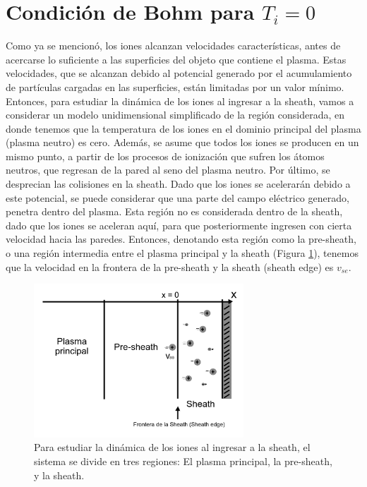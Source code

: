 \documentclass[../main.tex]{subfiles}
\begin{document}
	
	\section{Condición de Bohm para $T_i = 0$}
	
	Como ya se mencionó, los iones alcanzan velocidades características, antes de acercarse lo suficiente a las superficies del objeto que contiene el plasma. Estas velocidades, que se alcanzan debido al potencial generado por el acumulamiento de partículas cargadas en las superficies, están limitadas por un valor mínimo. Entonces, para estudiar la dinámica de los iones al ingresar a la sheath, vamos a considerar un modelo unidimensional simplificado de la región considerada, en donde tenemos que la temperatura de los iones en el dominio principal del plasma (plasma neutro) es cero. Además, se asume que todos los iones se producen en un mismo punto, a partir de los procesos de ionización que sufren los átomos neutros, que regresan de la pared al seno del plasma neutro. Por último, se desprecian las colisiones en la sheath. Dado que los iones se acelerarán debido a este potencial, se puede considerar que una parte del campo eléctrico generado, penetra dentro del plasma. Esta región no es considerada dentro de la sheath, dado que los iones se aceleran aquí, para que posteriormente ingresen con cierta velocidad hacia las paredes. Entonces, denotando esta región como la pre-sheath, o una región intermedia entre el plasma principal y la sheath (Figura \ref{fig:sheath_edge}), tenemos que la velocidad en la frontera de la pre-sheath y la sheath (sheath edge) es $v_{se}$. \\
	
	\begin{figure}[h]
        \centering
        \includegraphics[width=0.7\textwidth]{Images/sheath_edge.jpg}
        \caption{Para estudiar la dinámica de los iones al ingresar a la sheath, el sistema se divide en tres regiones: El plasma principal, la pre-sheath, y la sheath.}
        \label{fig:sheath_edge}
        \end{figure}
\end{document}
